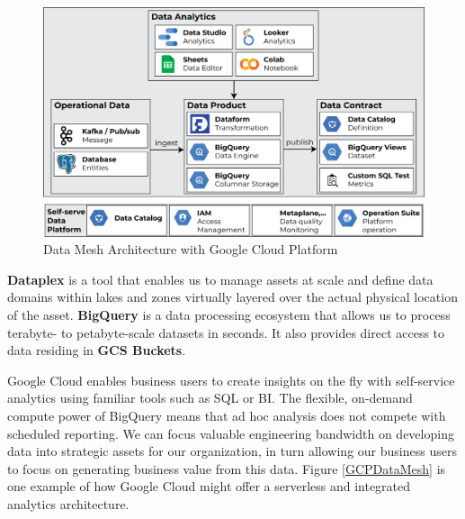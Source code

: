 \documentclass[12pt, a4paper]{book}
\begin{document}
\begin{figure}[ht]
	\begin{framed}
		\centering
		\includegraphics[width=12cm]{DataMeshGCP.png}
		\caption{Data Mesh Architecture with Google Cloud Platform}
		\label{DataMeshGCP}
	\end{framed}
\end{figure}

\textbf{Dataplex} is a tool that enables us to manage assets at scale and define data domains within lakes and zones virtually layered over the actual physical location of the asset. \textbf{BigQuery} is a data processing ecosystem that allows us to process terabyte- to petabyte-scale datasets in seconds. It also provides direct access to data residing in \textbf{GCS Buckets}. \cite{gcloud}

Google Cloud enables business users to create insights on the fly with self-service analytics using familiar tools such as SQL or BI. The flexible, on-demand compute power of BigQuery means that ad hoc analysis does not compete with scheduled reporting. We can focus valuable engineering bandwidth on developing data into strategic assets for our organization, in turn allowing our business users to focus on generating business value from this data. Figure \ref{GCPDataMesh} is one example of how Google Cloud might offer a serverless and integrated analytics architecture.
\end{document}
